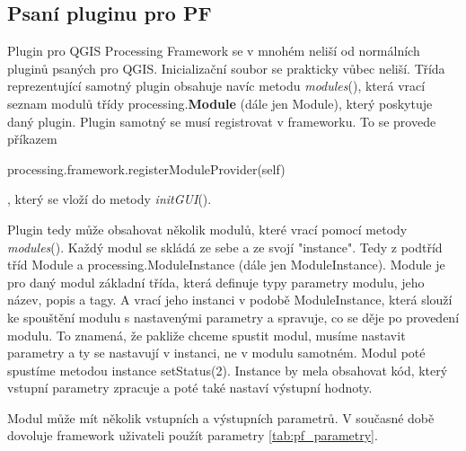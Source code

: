 \subsection{Psaní pluginu pro PF}
Plugin pro QGIS Processing Framework se v mnohém neliší od normálních pluginů psaných pro QGIS. Inicializační soubor se prakticky vůbec neliší. Třída reprezentující samotný plugin obsahuje navíc metodu \textit{modules}(), která vrací seznam modulů třídy processing.\textbf{Module} (dále jen Module), který poskytuje daný plugin. Plugin samotný se musí registrovat v frameworku. To se provede příkazem \begin{scriptsize}processing.framework.registerModuleProvider(self)\end{scriptsize}, který se vloží do metody \textit{initGUI}().

Plugin tedy může obsahovat několik modulů, které vrací pomocí metody \textit{modules}(). Každý modul se skládá ze sebe a ze svojí "instance". Tedy z podtříd tříd Module a processing.ModuleInstance (dále jen ModuleInstance). Module je pro daný modul základní třída, která definuje typy parametry modulu, jeho název, popis a tagy. A vrací jeho instanci v podobě ModuleInstance, která slouží ke spouštění modulu s nastavenými parametry a spravuje, co se děje po provedení modulu. To znamená, že pakliže chceme spustit modul, musíme nastavit parametry a ty se nastavují v instanci, ne v modulu samotném. Modul poté spustíme metodou instance setStatus(2). Instance by mela obsahovat kód, který vstupní parametry zpracuje a poté také nastaví výstupní hodnoty.

Modul může mít několik vstupních a výstupních parametrů. V současné době dovoluje framework uživateli použít parametry \ref{tab:pf_parametry}.

